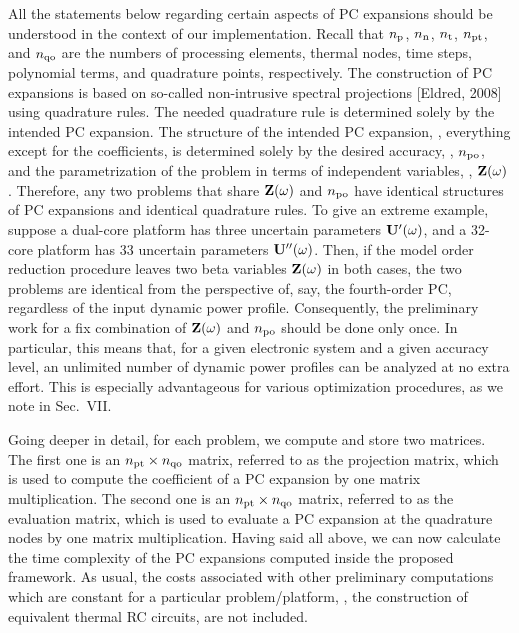 \begin{authors}
All the statements below regarding certain aspects of PC expansions should be understood in the context of our implementation.
Recall that ${n_\text{p}}$, ${n_\text{n}}$, ${n_\text{t}}$, ${n_\text{pt}}$, and ${n_\text{qo}}$ are the numbers of processing elements, thermal nodes, time steps, polynomial terms, and quadrature points, respectively.
The construction of PC expansions is based on so-called non-intrusive spectral projections [Eldred, 2008] using quadrature rules.
The needed quadrature rule is determined solely by the intended PC expansion.
The structure of the intended PC expansion, \ie, everything except for the coefficients, is determined solely by the desired accuracy, \ie, ${n_\text{po}}$, and the parametrization of the problem in terms of independent variables, \ie, $\mathbf{Z}(\omega)$.
Therefore, any two problems that share $\mathbf{Z}(\omega)$ and ${n_\text{po}}$ have identical structures of PC expansions and identical quadrature rules.
To give an extreme example, suppose a dual-core platform has three uncertain parameters $\mathbf{U}'(\omega)$, and a 32-core platform has 33 uncertain parameters $\mathbf{U}''(\omega)$.
Then, if the model order reduction procedure leaves two beta variables $\mathbf{Z}(\omega)$ in both cases, the two problems are identical from the perspective of, say, the fourth-order PC, regardless of the input dynamic power profile.
Consequently, the preliminary work for a fix combination of $\mathbf{Z}(\omega)$ and ${n_\text{po}}$ should be done only once.
In particular, this means that, for a given electronic system and a given accuracy level, an unlimited number of dynamic power profiles can be analyzed at no extra effort.
This is especially advantageous for various optimization procedures, as we note in Sec.~VII.

Going deeper in detail, for each problem, we compute and store two matrices.
The first one is an ${n_\text{pt}} \times {n_\text{qo}}$ matrix, referred to as the projection matrix, which is used to compute the coefficient of a PC expansion by one matrix multiplication.
The second one is an ${n_\text{pt}} \times {n_\text{qo}}$ matrix, referred to as the evaluation matrix, which is used to evaluate a PC expansion at the quadrature nodes by one matrix multiplication.
Having said all above, we can now calculate the time complexity of the PC expansions computed inside the proposed framework.
As usual, the costs associated with other preliminary computations which are constant for a particular problem/platform, \eg, the construction of equivalent thermal RC circuits, are not included.


\end{authors}
